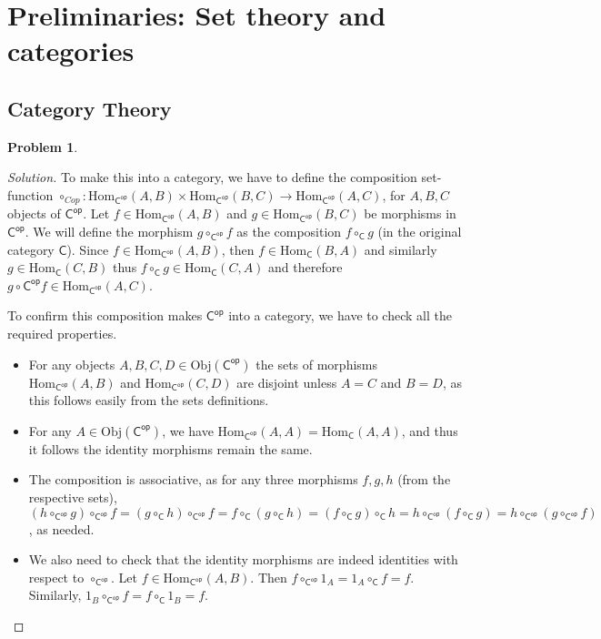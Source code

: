 \documentclass{article}
\theoremstyle{definition}
\newtheorem{problem-internal}{Problem}[subsection]
\newenvironment{problem}{
	\medskip
	\begin{problem-internal}
	}{
\end{problem-internal}
}
\newenvironment{solution}{
	\begin{proof}[Solution]
		\vspace{-8px}
		\setlength{\parskip}{4px}
		\setlength{\parindent}{0px}
	}{
\end{proof}
}
\newcommand{\Obj}{\mathrm{Obj}}
\newcommand{\Hom}{\mathrm{Hom}}
\newcommand{\C}{\mathsf{C}}
\newcommand{\Cop}{\mathsf{C^{op}}}
\begin{document}
\section{Preliminaries: Set theory and categories}
\setcounter{subsection}{2}

\subsection{Category Theory}

\begin{problem}
\end{problem}

\begin{solution}
	To make this into a category, we have to define the composition set-function $\circ_{Cop} : \Hom_{\Cop}(A,B) \times \Hom_{\Cop}(B,C) \to \Hom_{\Cop}(A,C)$, for $A,B,C$ objects of $\Cop$. Let $f \in \Hom_{\Cop}(A,B)$ and $g \in \Hom_{\Cop}(B,C)$ be morphisms in $\Cop$. We will define the morphism $g \circ_{\Cop} f$ as the composition $f \circ_{\C} g$ (in the original category $\C$). Since $f \in \Hom_{\Cop}(A,B)$, then $f \in \Hom_{\C}(B,A)$ and similarly $g \in \Hom_{\C}(C,B)$ thus $f \circ_{\C} g \in \Hom_{\C}(C,A)$ and therefore $g \circ{\Cop} f \in \Hom_{\Cop}(A,C)$.
	
	To confirm this composition makes $\Cop$ into a category, we have to check all the required properties.
	\begin{itemize}
		\item For any objects $A, B, C, D \in \Obj(\Cop)$ the sets of morphisms $\Hom_{\Cop}(A,B)$ and $\Hom_{\Cop}(C,D)$ are disjoint unless $A=C$ and $B=D$, as this follows easily from the sets definitions.
		\item For any $A \in \Obj(\Cop)$, we have $\Hom_{\Cop}(A,A) = \Hom_{\C}(A,A)$, and thus it follows the identity morphisms remain the same.
		\item The composition is associative, as for any three morphisms $f,g,h$ (from the respective sets), $(h \circ_{\Cop} g) \circ_{\Cop} f = (g \circ_{\C} h) \circ_{\Cop} f = f \circ_{\C} (g \circ_{\C} h) = (f \circ_{\C} g) \circ_{\C} h = h \circ_{\Cop} (f \circ_{\C} g) = h \circ_{\Cop} (g \circ_{\Cop} f)$, as needed.
		\item We also need to check that the identity morphisms are indeed identities with respect to $\circ_{\Cop}$. Let $f \in \Hom_{\Cop}(A,B)$. Then $f \circ_{\Cop} 1_A = 1_A \circ_{\C} f = f$. Similarly, $1_B \circ_{\Cop} f = f \circ_{\C} 1_B = f$.
	\end{itemize}
\end{solution}
\end{document}
